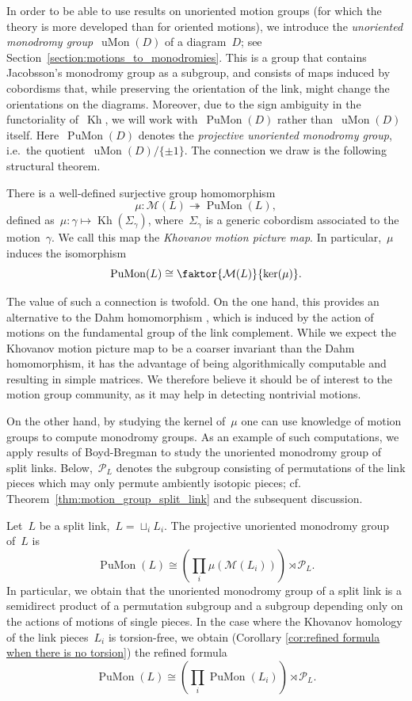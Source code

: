 \documentclass{amsart}
\theoremstyle{definition}
\newenvironment{customthm}[1]
  {\renewcommand\theinnercustomthm{#1}\innercustomthm}
  {\endinnercustomthm}
\theoremstyle{definition}
\theoremstyle{definition}
\theoremstyle{definition}
\newcommand{\calM}{\mathcal{M}}
\newcommand{\calP}{\mathcal{P}} %
\DeclareMathOperator{\PuMon}{PuMon}
\DeclareMathOperator{\Kh}{Kh}
\DeclareMathOperator{\uMon}{uMon}
\begin{document}
In order to be able to use results on unoriented motion groups (for which the theory is more developed than for oriented motions), we introduce the \textit{unoriented monodromy group}~$\uMon(D)$ of a diagram~$D$; see Section~\ref{section:motions_to_monodromies}. This is a group that contains Jacobsson's monodromy group as a subgroup, and consists of maps induced by cobordisms that, while preserving the orientation of the link, might change the orientations on the diagrams. Moreover, due to the sign ambiguity in the functoriality of~$\Kh$, we will work with~$\PuMon(D)$ rather than~$\uMon(D)$ itself. Here~$\PuMon(D)$ denotes the \emph{projective unoriented monodromy group}, i.e.~the quotient~$\uMon(D) / \{\pm1\}$. The connection we draw is the following structural theorem.

\begin{customthm}{A}\label{thm:motions_to_monodromies}
    There is a well-defined surjective group homomorphism~$$\mu \colon \mathcal{M}(L) \twoheadrightarrow \PuMon(L),$$
    defined as~$\mu \colon \gamma \mapsto \Kh(\Sigma_{\gamma})$, where~$\Sigma_{\gamma}$ is a generic cobordism associated to the motion~$\gamma$. We call this map the \emph{Khovanov motion picture map}.
    In particular,~$\mu$ induces the isomorphism~$$ \PuMon(L) \cong \faktor{\calM(L)}{\ker(\mu)}.$$
\end{customthm}

The value of such a connection is twofold. On the one hand, this provides an alternative to the Dahm homomorphism \cite{Dahm62}, which is induced by the action of motions on the fundamental group of the link complement. While we expect the Khovanov motion picture map to be a coarser invariant than the Dahm homomorphism, it has the advantage of being algorithmically computable and resulting in simple matrices. We therefore believe it should be of interest to the motion group community, as it may help in detecting nontrivial motions. 

On the other hand, by studying the kernel of~$\mu$ one can use knowledge of motion groups to compute monodromy groups. As an example of such computations, we apply results of Boyd-Bregman \cite{Boyd-Bregman} to study the unoriented monodromy group of split links. Below,~$\calP_L$ denotes the subgroup consisting of permutations of the link pieces which may only permute ambiently isotopic pieces; cf. Theorem~\ref{thm:motion_group_split_link} and the subsequent discussion.

\begin{customthm}{B}\label{thm:monodromy_group_split_links}
    Let~$L$ be a split link,~$L=\sqcup_iL_i$. The projective unoriented monodromy group of~$L$ is 
   ~$$ \PuMon(L)\cong \left(\prod _i\mu (\calM(L_i))\right)\rtimes \calP_L.$$
    In particular, we obtain that the unoriented monodromy group of a split link is a semidirect product of a permutation subgroup and a subgroup depending only on the actions of motions of single pieces. In the case where the Khovanov homology of the link pieces~$L_i$ is torsion-free, we obtain (Corollary \ref{cor:refined formula when there is no torsion}) the refined formula
   ~$$ \PuMon(L)\cong \left(\prod _i \PuMon(L_i)\right)\rtimes \calP_L.$$
\end{customthm}
\end{document}
